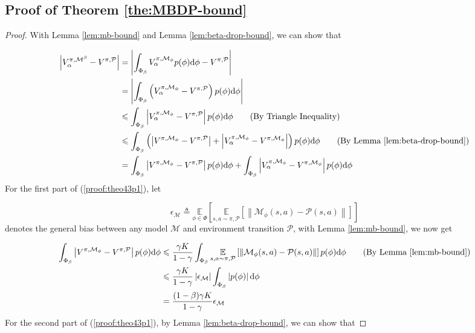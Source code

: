 \subsection{Proof of Theorem \ref{the:MBDP-bound}}

\begin{proof}

With Lemma \ref{lem:mb-bound} and Lemma \ref{lem:beta-drop-bound}, we can show that

\begin{align}
\left|{V}_\alpha^{\pi, \mathcal{M}^\beta}-{V}^{\pi, \mathcal{P}}\right|&=\left|\int_{\Phi_\beta}{V}_\alpha^{\pi, \mathcal{M}_{\phi}}p(\phi)\mathrm{d}\phi-{V}^{\pi, \mathcal{P}}\right| \notag\\
&=\left|\int_{\Phi_\beta}\left({V}_\alpha^{\pi, \mathcal{M}_{\phi}}-{V}^{\pi, \mathcal{P}}\right)p(\phi)\mathrm{d}\phi\right| \notag\\
&\leq\int_{\Phi_\beta}\left|{V}_\alpha^{\pi, \mathcal{M}_{\phi}}-{V}^{\pi, \mathcal{P}}\right|p(\phi)\mathrm{d}\phi \tag{By Triangle Inequality}\\
&\leq\int_{\Phi_\beta}\left(\left|{V}^{\pi, \mathcal{M}_{\phi}}-{V}^{\pi, \mathcal{P}}\right|+\left|{V}_\alpha^{\pi, \mathcal{M}_{\phi}} - {V}^{\pi,\mathcal{M}_{\phi}}\right|\right)p(\phi)\mathrm{d}\phi\quad \tag{By Lemma \ref{lem:beta-drop-bound}}\\
&= \int_{\Phi_\beta}\left|{V}^{\pi, \mathcal{M}_{\phi}}-{V}^{\pi, \mathcal{P}}\right|p(\phi)\mathrm{d}\phi+\int_{\Phi_\beta}\left|{V}_\alpha^{\pi, \mathcal{M}_{\phi}} - {V}^{\pi,\mathcal{M}_{\phi}}\right|p(\phi)\mathrm{d}\phi \label{proof:theo43p1}
\end{align}
For the first part of (\ref{proof:theo43p1}), let

$$
\epsilon_{\mathcal{M}}\triangleq\underset{\phi\in\Phi}{\mathbb{E}}\left[\underset{s,a\sim \pi,\mathcal{P}}{\mathbb{E}}\left[\left\|\mathcal{M}_\phi(s, a)-\mathcal{P}(s, a)\right\|\right]\right]
$$
denotes the general bias between any model $\mathcal{M}$ and environment transition $\mathcal{P}$, with Lemma \ref{lem:mb-bound}, we now get

\begin{align}
\int_{\Phi_\beta}\left|{V}^{\pi, \mathcal{M}_{\phi}}-{V}^{\pi, \mathcal{P}}\right|p(\phi)\mathrm{d}\phi &\leq \frac{\gamma K}{1-\gamma}\int_{\Phi_\beta}\underset{s,a\sim\pi,\mathcal{P}}{\mathbb{E}}\left[\left\|\mathcal{M}_\phi(s, a)-\mathcal{P}(s, a)\right\|\right]p(\phi)\mathrm{d}\phi \tag{By Lemma \ref{lem:mb-bound}}\\
&\leq \frac{\gamma K}{1-\gamma}\left|\epsilon_{\mathcal{M}}\right|\int_{\Phi_\beta}\left|p(\phi)\right|\mathrm{d}\phi\notag\\
&=\frac{(1-\beta)\gamma K}{1-\gamma}\epsilon_{\mathcal{M}} \label{proof:theo43p2}
\end{align}
For the second part of (\ref{proof:theo43p1}), by Lemma \ref{lem:beta-drop-bound}, we can show that


\end{proof}
